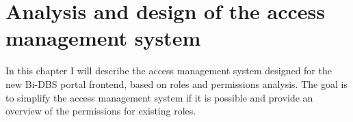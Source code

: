 \chapter{Analysis and design of the access management system} In this chapter I will describe the access management system designed for the new Bi-DBS portal frontend, based on roles and permissions analysis. The goal is to simplify the access management system if it is possible and provide an overview of the permissions for existing roles.







